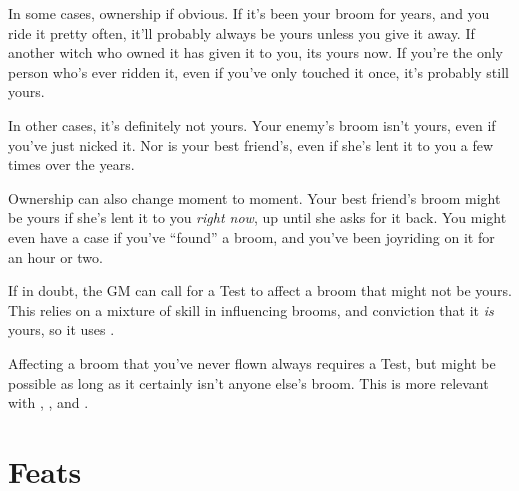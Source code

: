 In some cases, ownership if obvious.
If it's been your broom for years, and you ride it pretty often, it'll probably always be yours unless you give it away.
If another witch who owned it has given it to you, its yours now.
If you're the only person who's ever ridden it, even if you've only touched it once, it's probably still yours.

In other cases, it's definitely not yours.
Your enemy's broom isn't yours, even if you've just nicked it.
Nor is your best friend's, even if she's lent it to you a few times over the years.

Ownership can also change moment to moment.
Your best friend's broom might be yours if she's lent it to you \emph{right now}, up until she asks for it back.
You might even have a case if you've ``found'' a broom, and you've been joyriding on it for an hour or two.

If in doubt, the GM can call for a Test to affect a broom that might not be yours.
This relies on a mixture of skill in influencing brooms, and conviction that it \emph{is} yours, so it uses .

Affecting a broom that you've never flown always requires a Test, but might be possible as long as it certainly isn't anyone else's broom.
This is more relevant with , , and .

\section{Feats}




